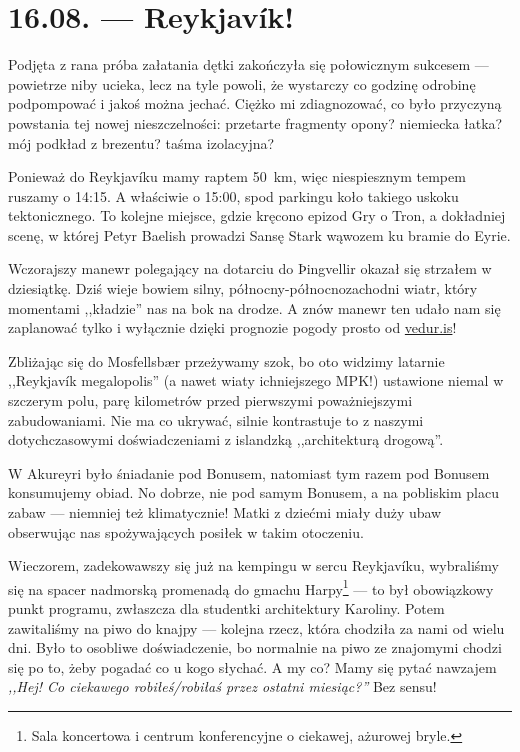 \chapter*{16.08. --- Reykjavík!}

Podjęta z rana próba załatania dętki zakończyła się połowicznym sukcesem --- powietrze niby ucieka, lecz na tyle powoli, że wystarczy co godzinę odrobinę podpompować i jakoś można jechać. Ciężko mi zdiagnozować, co było przyczyną powstania tej nowej nieszczelności: przetarte fragmenty opony? niemiecka łatka? mój podkład z brezentu? taśma izolacyjna?

Ponieważ do Reykjavíku mamy raptem 50~km, więc niespiesznym tempem ruszamy o 14:15. A właściwie o 15:00, spod parkingu koło takiego uskoku tektonicznego. To kolejne miejsce, gdzie kręcono epizod Gry o Tron, a dokładniej scenę, w której Petyr Baelish prowadzi Sansę Stark wąwozem ku bramie do Eyrie.

Wczorajszy manewr polegający na dotarciu do Þingvellir okazał się strzałem w dziesiątkę. Dziś wieje bowiem silny, północny-północnozachodni wiatr, który momentami ,,kładzie'' nas na bok na drodze. A znów manewr ten udało nam się zaplanować tylko i wyłącznie dzięki prognozie pogody prosto od \url{vedur.is}!

Zbliżając się do Mosfellsbær przeżywamy szok, bo oto widzimy latarnie ,,Reykjavík megalopolis'' (a nawet wiaty ichniejszego MPK!) ustawione niemal w szczerym polu, parę kilometrów przed pierwszymi poważniejszymi zabudowaniami. Nie ma co ukrywać, silnie kontrastuje to z naszymi dotychczasowymi doświadczeniami z islandzką ,,architekturą drogową''.


W Akureyri było śniadanie pod Bonusem, natomiast tym razem pod Bonusem konsumujemy obiad. No dobrze, nie pod samym Bonusem, a na pobliskim placu zabaw --- niemniej też klimatycznie! Matki z dziećmi miały duży ubaw obserwując nas spożywających posiłek w takim otoczeniu.

Wieczorem, zadekowawszy się już na kempingu w sercu Reykjavíku, wybraliśmy się na spacer nadmorską promenadą do gmachu Harpy\footnote{Sala koncertowa i centrum konferencyjne o ciekawej, ażurowej bryle.} --- to był obowiązkowy punkt programu, zwłaszcza dla studentki architektury Karoliny. Potem zawitaliśmy na piwo do knajpy --- kolejna rzecz, która chodziła za nami od wielu dni. Było to osobliwe doświadczenie, bo normalnie na piwo ze znajomymi chodzi się po to, żeby pogadać co u kogo słychać. A my co? Mamy się pytać nawzajem \emph{,,Hej! Co ciekawego robiłeś/robiłaś przez ostatni miesiąc?''} Bez sensu!

